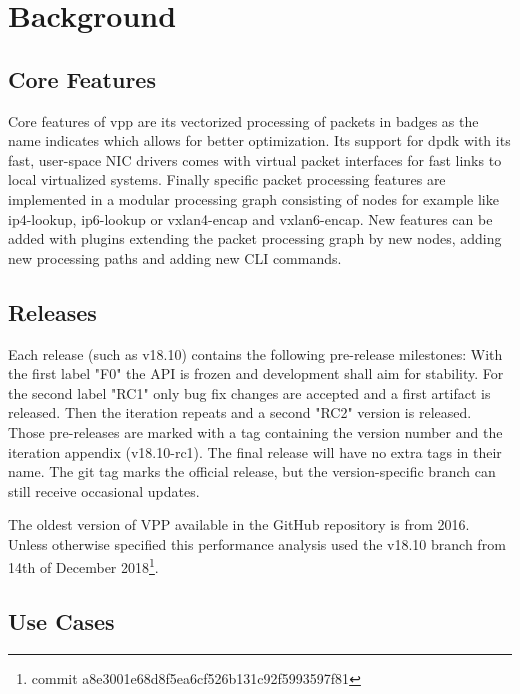 
\chapter{Background}

\section{Core Features}


Core features of \Ac{vpp} are its vectorized processing of packets in
badges as the name indicates which allows for better optimization. Its
support for \Ac{dpdk} with its fast, user-space NIC drivers comes with
virtual packet interfaces for fast links to local virtualized systems.
Finally specific packet processing features are implemented in a
modular processing graph consisting of nodes for example like
ip4-lookup, ip6-lookup or vxlan4-encap and vxlan6-encap. New features
can be added with plugins extending the packet processing graph by new
nodes, adding new processing paths and adding new CLI commands.


\section{Releases}


Each release (such as v18.10) contains the following pre-release
milestones:  With the first label "F0" the API is frozen and
development shall aim for stability. For the second label "RC1" only
bug fix changes are accepted and a first artifact is released. Then
the iteration repeats and a second "RC2" version is released. Those
pre-releases are marked with a tag containing the version number and
the iteration appendix (v18.10-rc1). The final release will have no
extra tags in their name. The git tag marks the official release, but
the version-specific branch can still receive occasional updates.
\cite{vppwiki:releases}

The oldest version of VPP available in the GitHub repository is from
2016. Unless otherwise specified this performance analysis used the
v18.10 branch from 14th of December 2018\footnote{commit
a8e3001e68d8f5ea6cf526b131c92f5993597f81}.


\section{Use Cases}

